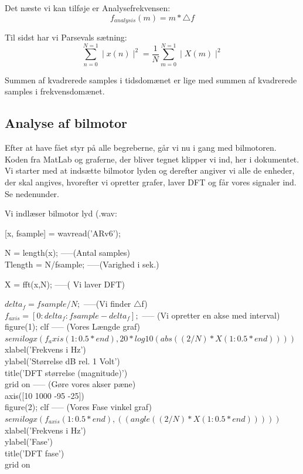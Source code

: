 \documentclass[12pt, letterpaper]{article}
\begin{document}
Det næste vi kan tilføje er Analysefrekvensen: 
$$f_{analysis}(m)=m*\bigtriangleup f$$

Til sidst har vi Parsevals sætning: 
$$ \sum\limits_{n=0}^{N=1} \mid x(n) \mid^2 = \frac{1}{N} \sum\limits_{m=0}^{N=1} \mid X(m) \mid^2    $$

Summen af kvadrerede samples i tidsdomænet er lige med summen af kvadrerede samples i frekvensdomænet.


\subsection{Analyse af bilmotor}
Efter at have fået styr på alle begreberne, går vi nu i gang med bilmotoren. Koden fra MatLab og graferne, der bliver tegnet klipper vi ind, her i dokumentet. 
Vi starter med at indsætte bilmotor lyden og derefter angiver vi alle de enheder, der skal angives, hvorefter vi opretter grafer, laver DFT og får vores signaler ind. Se nedenunder. 

Vi indlæser bilmotor lyd (.wav: 

[x, fsample] = wavread('ARv6');

N = length(x);       -----(Antal samples)  \\       
Tlength = N/fsample;     -----(Varighed i sek.)              

X = fft(x,N);   -----( Vi laver DFT)                       

$delta_f = fsample/N;$  -----(Vi finder $\bigtriangleup$f)   \\ 
$f_{axis} = [0:delta_f:fsample-delta_f];$ ----- (Vi opretter en akse med interval)\\ 

figure(1); clf  ----- (Vores Længde graf)    \\   
$semilogx(f_axis(1:0.5*end), 20*log10(abs((2/N)*X(1:0.5*end))))$\\
xlabel('Frekvens i Hz') \\
ylabel('Størrelse dB rel. 1 Volt') \\
title('DFT størrelse (magnitude)') \\
grid on       -----   (Gøre vores akser pæne)   \\   
axis([10 1000 -95 -25]) \\

figure(2); clf 		-----  (Vores Fase vinkel graf)   \\                     
$semilogx(f_{axis}(1:0.5*end), ((angle((2/N)*X(1:0.5*end)))))$\\
xlabel('Frekvens i Hz')\\
ylabel('Fase')\\
title('DFT fase')\\
grid on \\
\end{document}
